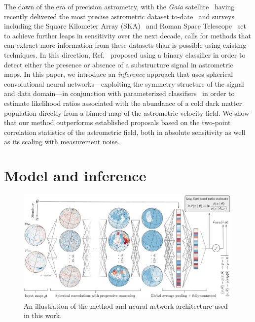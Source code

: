 \documentclass[]{article}
\begin{document}
The dawn of the era of precision astrometry, with the \emph{Gaia} satellite~\citep{2016A&A...595A...1G} having recently delivered the most precise astrometric dataset to-date~\citep{2018A&A...616A...1G,2018A&A...616A...2L,2021A&A...649A...1G} and surveys including the Square Kilometer Array (SKA)~\citep{Fomalont:2004hr,Jarvis:2015tqa} and Roman Space Telescope~\citep{2019JATIS...5d4005W} set to achieve further leaps in sensitivity over the next decade, calls for methods that can extract more information from these datasets than is possible using existing techniques. In this direction, Ref.~\cite{Vattis:2020kaa} proposed using a binary classifier in order to detect either the presence or absence of a substructure signal in astrometric maps. In this paper, we introduce an \emph{inference} approach that uses spherical convolutional neural networks---exploiting the symmetry structure of the signal and data domain---in conjunction with parameterized classifiers~\citep{Cranmer:2015bka,Baldi:2016fzo} in order to estimate likelihood ratios associated with the abundance of a cold dark matter population directly from a binned map of the astrometric velocity field. 
We show that our method outperforms established proposals based on the two-point correlation statistics of the astrometric field, both in absolute sensitivity as well as its scaling with measurement noise.

\section{Model and inference}
\label{sec:model}

\begin{figure}[!htbp]
\centering
\includegraphics[width=0.99\textwidth]{figures/summary.pdf}
\caption{An illustration of the method and neural network architecture used in this work.}
\label{fig:model}
\end{figure}
\end{document}
